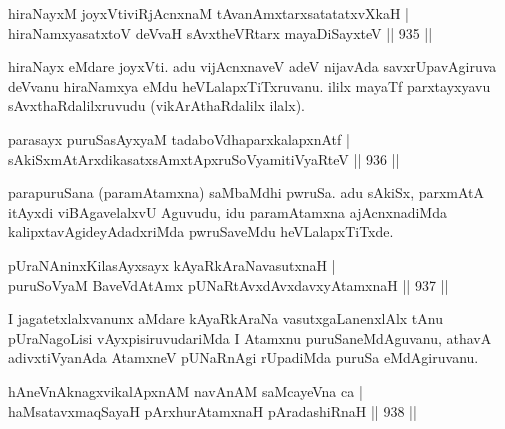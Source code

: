
\begin{shl}
hiraNayxM joyxVtiviRjAcnxnaM tAvanAmxtarxsatatatxvXkaH | \\
hiraNamxyasatxtoV deVvaH sAvxtheVR\s tarx mayaDiSayxteV \hfill||  935 ||  
\end{shl}

\begin{artha}
hiraNayx eMdare joyxVti. adu vijAcnxnaveV adeV nijavAda savxrUpavAgiruva deVvanu hiraNamxya eMdu heVLalapxTiTxruvanu. ililx mayaTf parxtayxyavu sAvxthaRdalilxruvudu (vikArAthaRdalilx ilalx).
\end{artha}


\begin{shl}
parasayx puruSasAyxyaM tadaboVdhaparxkalapxnAtf | \\
sAkiSxmAtArxdikasatxsAmxtApxruSoV\s yamitiVyaRteV \hfill||  936 ||  
\end{shl}

\begin{artha}
parapuruSana (paramAtamxna) saMbaMdhi pwruSa. adu sAkiSx, parxmAtA itAyxdi viBAgavelalxvU Aguvudu, idu paramAtamxna ajAcnxnadiMda kalipxtavAgideyAdadxriMda pwruSaveMdu heVLalapxTiTxde.
\end{artha}


\begin{shl}
pUraNAninxKilasAyxsayx kAyaRkAraNavasutxnaH | \\
puruSoV\s yaM BaveVdAtAmx pUNaRtAvxdAvx\s davxyAtamxnaH \hfill||  937 ||  
\end{shl}

\begin{artha}
I jagatetxlalxvanunx aMdare kAyaRkAraNa vasutxgaLanenxlAlx tAnu pUraNagoLisi vAyxpisiruvudariMda I Atamxnu puruSaneMdAguvanu, athavA adivxtiVyanAda AtamxneV pUNaRnAgi rUpadiMda puruSa eMdAgiruvanu.
\end{artha}


\begin{shl}
hAneVnAknagx\footnotemark[1]vikalApxnAM navAnAM saMcayeVna ca | \\
haMsatavxmaqSayaH pArxhurAtamxnaH pAradashiRnaH \hfill||  938 ||  
\end{shl}

